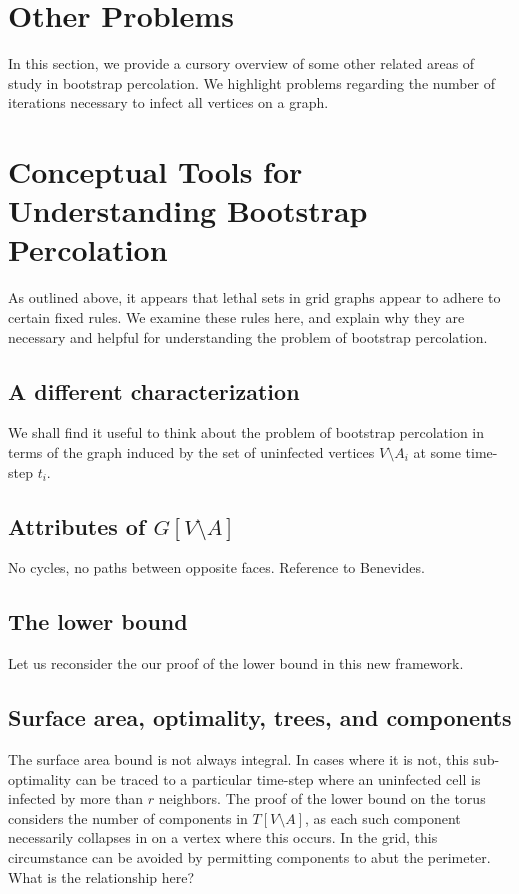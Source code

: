 \section{Other Problems}

In this section, we provide a cursory overview of some other related areas of study in bootstrap percolation. We highlight problems regarding the number of iterations necessary to infect all vertices on a graph.

\section{Conceptual Tools for Understanding Bootstrap Percolation}

As outlined above, it appears that lethal sets in grid graphs appear to adhere to certain fixed rules. We examine these rules here, and explain why they are necessary and helpful for understanding the problem of bootstrap percolation.

\subsection{A different characterization}

We shall find it useful to think about the problem of bootstrap percolation in terms of the graph induced by the set of uninfected vertices $V \setminus A_i$ at some time-step $t_i$. 

\subsection{Attributes of $G[V \setminus A]$}

No cycles, no paths between opposite faces. Reference to Benevides.

\subsection{The lower bound}

Let us reconsider the our proof of the lower bound in this new framework. 

\subsection{Surface area, optimality, trees, and components}

The surface area bound is not always integral. In cases where it is not, this sub-optimality can be traced to a particular time-step where an uninfected cell is infected by more than $r$ neighbors. The proof of the lower bound on the torus considers the number of components in $T[V \setminus A]$, as each such component necessarily collapses in on a vertex where this occurs. In the grid, this circumstance can be avoided by permitting components to abut the perimeter. What is the relationship here?

